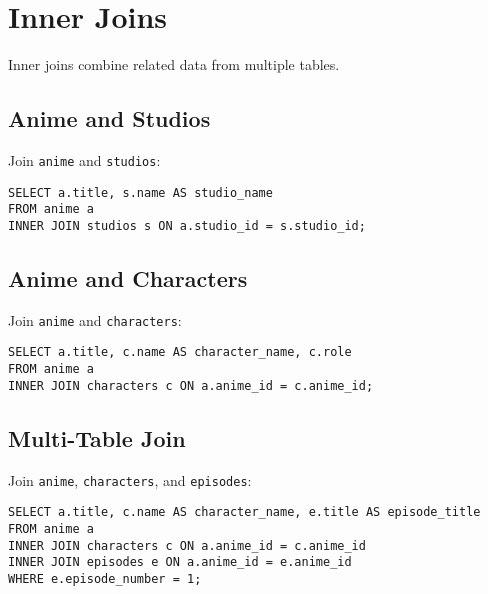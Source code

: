 \documentclass[10pt]{article}
\begin{document}
\section{Inner Joins}
Inner joins combine related data from multiple tables.

\subsection{Anime and Studios}
Join \texttt{anime} and \texttt{studios}:
\begin{verbatim}
SELECT a.title, s.name AS studio_name
FROM anime a
INNER JOIN studios s ON a.studio_id = s.studio_id;
\end{verbatim}

\subsection{Anime and Characters}
Join \texttt{anime} and \texttt{characters}:
\begin{verbatim}
SELECT a.title, c.name AS character_name, c.role
FROM anime a
INNER JOIN characters c ON a.anime_id = c.anime_id;
\end{verbatim}

\subsection{Multi-Table Join}
Join \texttt{anime}, \texttt{characters}, and \texttt{episodes}:
\begin{verbatim}
SELECT a.title, c.name AS character_name, e.title AS episode_title
FROM anime a
INNER JOIN characters c ON a.anime_id = c.anime_id
INNER JOIN episodes e ON a.anime_id = e.anime_id
WHERE e.episode_number = 1;
\end{verbatim}
\end{document}
